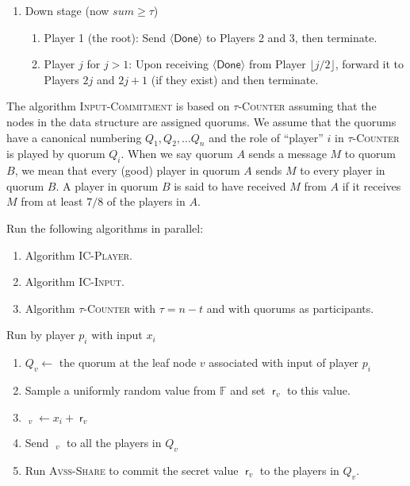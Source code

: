 \documentclass[10pt]{llncs}
\newcommand{\F}{\mathbb{F}}
\newcommand{\fgoodq}{7/8\xspace}
\newcommand{\done}{$\langle\mathsf{Done}\rangle$\xspace}
\newcommand{\vssSh}{\textsc{Avss-Share}\xspace}
\newcommand{\tc}{\textsc{$\tau$-Counter}\xspace}
\newcommand{\ic}{\textsc{Input-Commitment}\xspace}
\newcommand{\icPlayer}{\textsc{IC-Player}\xspace}
\newcommand{\icInput}{\textsc{IC-Input}\xspace}
\DeclareMathOperator{\mask}{\mathsf{r}}
\DeclareMathOperator{\mv}{\mathsf{\hat{y}}}
\begin{document}
\begin{algorithm}
\begin{enumerate}
\begin{enumerate}
\begin{itemize}
\end{itemize} 
\end{enumerate}
\item Down stage (now $sum \ge \tau$)
\begin{enumerate}
\item Player 1 (the root):  Send \done to Players 2 and 3, then terminate.
\item Player $j$ for $j>1$: Upon receiving \done from Player 
$\lfloor j/2 \rfloor$, forward it to Players $2j$ and $2j+1$ (if they exist) 
and then terminate.
\end{enumerate}
\end{enumerate}
\label{alg:tc}
\end{algorithm}

















The algorithm \ic is based on \tc assuming that the nodes in the data 
structure are assigned quorums. We assume that the quorums have a canonical 
numbering $Q_1,Q_2,\dots Q_n$ and the role of ``player'' $i$ in \tc is 
played by 
quorum $Q_i$. When we say quorum $A$ sends a message $M$ to quorum
$B$, we mean that every (good) player in quorum $A$ sends $M$ to every
player in quorum $B$. A player in quorum $B$ is said to have received
$M$ from $A$ if it receives $M$ from at least $\fgoodq$ of the players
in $A$.
\begin{algorithm}
\caption{\ic}\label{alg:aggr}
Run the following algorithms in parallel:
\begin{enumerate}
\item Algorithm \icPlayer.
\item Algorithm \icInput.
\item Algorithm \tc with $\tau = n-t$ and with quorums as participants.
\end{enumerate}
\end{algorithm}

\begin{algorithm}
\caption{\icPlayer}\label{alg:icindividual}
{Run by player $p_i$ with input $x_i$}
\begin{enumerate}
\item $Q_{v} \leftarrow$ the quorum at the leaf node $v$ associated with input of player $p_i$ 
\item Sample a uniformly random value  from $\F$ and set $\mask_{v}$ to this value.
\item $\mv_{v} \leftarrow x_i + \mask_{v} $
\item Send $\mv_{v}$ to all the players in $Q_{v}$
\item Run \vssSh to commit the secret value $\mask_{v}$ to the players in $Q_{v}$.
\end{enumerate}
\end{algorithm}
\end{document}
